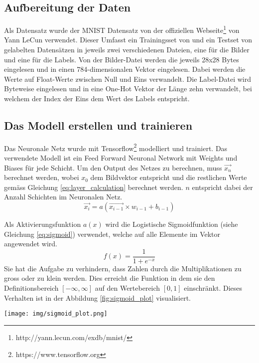 \documentclass[Interploate_hadwritten_Digits.tex]{subfiles}
\begin{document}
	\subsection{Aufbereitung der Daten}
	Als Datensatz wurde der MNIST Datensatz von der offiziellen Webseite\footnote{ http://yann.lecun.com/exdb/mnist/} von Yann LeCun verwendet. Dieser Umfasst ein Trainingsset von  und ein Testset von  gelabelten Datensätzen in jeweils zwei verschiedenen Dateien, eine für die Bilder und eine für die Labels. Von der Bilder-Datei werden die jeweils 28x28 Bytes eingelesen und in einen 784-dimensionalen Vektor eingelesen. Dabei werden die Werte auf Float-Werte zwischen Null und Eins verwandelt. Die Label-Datei wird Byteweise eingelesen und in eine One-Hot Vektor der Länge zehn verwandelt, bei welchem der Index der Eins dem Wert des Labels entspricht. 
	
	\subsection{Das Modell erstellen und trainieren}
	Das Neuronale Netz wurde mit Tensorflow\footnote{https://www.tensorflow.org} modelliert und trainiert. Das verwendete Modell ist ein Feed Forward Neuronal Network mit Weights und Biases für jede Schicht. Um den Output des Netzes zu berechnen, muss $ \vec{x_{n}} $ berechnet werden, wobei $ x_{0} $ dem Bildvektor entspricht und die restlichen Werte gemäss Gleichung \ref{eq:layer_calculation} berechnet werden. $ n $ entspricht dabei der Anzahl Schichten im Neuronalen Netz.
	\begin{equation}
	\vec{x_{i}} = a(\vec{x_{i-1}} \times w_{i-1} + b_{i-1})
	\label{eq:layer_calculation}
	\end{equation}
	
	Als Aktivierungsfunktion $ a(x) $ wird die Logistische Sigmoidfunktion (siehe Gleichung \ref{eq:sigmoid}) verwendet, welche auf alle Elemente im Vektor angewendet wird. 
	\begin{equation}
	f(x)=\frac{1}{1+e^{-x}}
	\label{eq:sigmoid}
	\end{equation}
	Sie hat die Aufgabe zu verhindern, dass Zahlen durch die Multiplikationen zu gross oder zu klein werden. Dies erreicht die Funktion in dem sie den Definitionsbereich $ [-\infty, \infty] $ auf den Wertebereich $ [0, 1] $ einschränkt. Dieses Verhalten ist in der Abbildung \ref{fig:sigmoid_plot} visualisiert.
	\begin{Figure}
		\centering
		\texttt{[image: img/sigmoid\_plot.png]}
		\label{fig:sigmoid_plot}
	\end{Figure}
\end{document}
